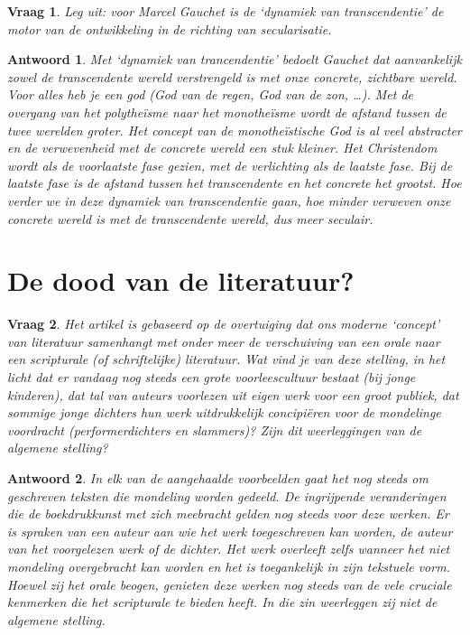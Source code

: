\documentclass{article}
\theoremstyle{plain}
\newtheorem{question}{Vraag}
\theoremstyle{nonumberplain}
\newtheorem{answer}{Antwoord}
\begin{document}
\begin{question}
Leg uit: voor Marcel Gauchet is de ‘dynamiek van transcendentie’ de motor van de
ontwikkeling in de richting van secularisatie.
\end{question}

\begin{answer}

Met `dynamiek van trancendentie' bedoelt Gauchet dat aanvankelijk zowel de
transcendente wereld verstrengeld is met onze concrete, zichtbare wereld. Voor
alles heb je een god (God van de regen, God van de zon, \dots). Met de overgang
van het polythe\"isme naar het monothe\"isme wordt de afstand tussen de twee
werelden groter. Het concept van de monothe\"istische God is al veel abstracter
en de verwevenheid met de concrete wereld een stuk kleiner. Het Christendom
wordt als de voorlaatste fase gezien, met de verlichting als de laatste fase.
Bij de laatste fase is de afstand tussen het transcendente en het concrete het
grootst. Hoe verder we in deze dynamiek van transcendentie gaan, hoe minder
verweven onze concrete wereld is met de transcendente wereld, dus meer seculair.

\end{answer}

\section{De dood van de literatuur?}

\begin{question}
Het artikel is gebaseerd op de overtuiging dat ons moderne ‘concept’ van
literatuur samenhangt met onder meer de verschuiving van een orale naar een
scripturale (of schriftelijke) literatuur. Wat vind je van deze stelling, in het
licht dat er vandaag nog steeds een grote voorleescultuur bestaat (bij jonge
kinderen), dat tal van auteurs voorlezen uit eigen werk voor een groot publiek,
dat sommige jonge dichters hun werk uitdrukkelijk concipiëren voor de mondelinge
voordracht (performerdichters en slammers)? Zijn dit weerleggingen van de
algemene stelling?
\end{question}

\begin{answer}

In elk van de aangehaalde voorbeelden gaat het nog steeds om geschreven teksten
die mondeling worden gedeeld. De ingrijpende veranderingen die de boekdrukkunst
met zich meebracht gelden nog steeds voor deze werken. Er is spraken van een
auteur aan wie het werk toegeschreven kan worden, de auteur van het voorgelezen
werk of de dichter. Het werk overleeft zelfs wanneer het niet mondeling
overgebracht kan worden en het is toegankelijk in zijn tekstuele vorm. Hoewel
zij het orale beogen, genieten deze werken nog steeds van de vele cruciale
kenmerken die het scripturale te bieden heeft. In die zin weerleggen zij niet de
algemene stelling.

\end{answer}
\end{document}
